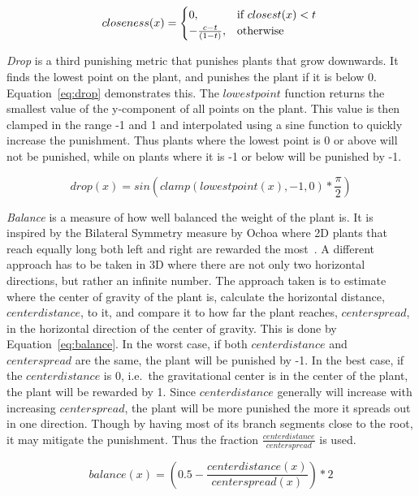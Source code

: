 \begin{equation}
\label{eq:closeness}
    closeness(x) =
    \begin{cases}
        0,& \text{if } closest(x) < t \\
        -\frac{c - t}{(1 - t)},& \text{otherwise}
    \end{cases} \\
\end{equation}

\textit{Drop} is a third punishing metric that punishes plants that grow downwards.
It finds the lowest point on the plant, and punishes the plant if it is below 0.
Equation~\ref{eq:drop} demonstrates this.
The $lowestpoint$ function returns the smallest value of the y-component of all points on the plant.
This value is then clamped in the range -1 and 1 and interpolated using a sine function to quickly increase the punishment.
Thus plants where the lowest point is 0 or above will not be punished, while on plants where it is -1 or below will be punished by -1.

\begin{equation}
\label{eq:drop}
drop(x) = sin(clamp(lowestpoint(x), -1, 0) * \frac{\pi}{2})
\end{equation}

\textit{Balance} is a measure of how well balanced the weight of the plant is.
It is inspired by the Bilateral Symmetry measure by Ochoa where 2D plants that reach equally long both left and right are rewarded the most~\cite{1998Ochoa}.
A different approach has to be taken in 3D where there are not only two horizontal directions, but rather an infinite number.
The approach taken is to estimate where the center of gravity of the plant is, calculate the horizontal distance, $centerdistance$, to it, and compare it to how far the plant reaches, $centerspread$, in the horizontal direction of the center of gravity.
This is done by Equation~\ref{eq:balance}.
In the worst case, if both $centerdistance$ and $centerspread$ are the same, the plant will be punished by -1.
In the best case, if the $centerdistance$ is 0, i.e.\ the gravitational center is in the center of the plant, the plant will be rewarded by 1.
Since $centerdistance$ generally will increase with increasing $centerspread$, the plant will be more punished the more it spreads out in one direction.
Though by having most of its branch segments close to the root, it may mitigate the punishment.
Thus the fraction $\frac{centerdistance}{centerspread}$ is used.

\begin{equation}
\label{eq:balance}
balance(x) = (0.5 - \frac{centerdistance(x)}{centerspread(x)}) * 2
\end{equation}

